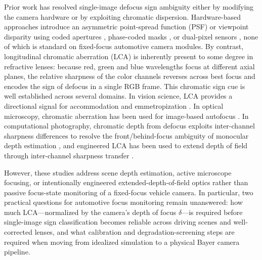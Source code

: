\documentclass{ieee-ojvt}
\begin{document}
Prior work has resolved single-image defocus sign ambiguity either by modifying the camera hardware or by exploiting chromatic dispersion. Hardware-based approaches introduce an asymmetric point-spread function (PSF) or viewpoint disparity using coded apertures \cite{levin2007coded}, phase-coded masks \cite{haim2018phase}, or dual-pixel sensors \cite{garg2019dual}, none of which is standard on fixed-focus automotive camera modules. By contrast, longitudinal chromatic aberration (LCA) is inherently present to some degree in refractive lenses: because red, green and blue wavelengths focus at different axial planes, the relative sharpness of the color channels reverses across best focus and encodes the sign of defocus in a single RGB frame. This chromatic sign cue is well established across several domains. In vision science, LCA provides a directional signal for accommodation and emmetropization \cite{kruger1986stimuli,seidemann2002effects,rucker2012chicks}. In optical microscopy, chromatic aberration has been used for image-based autofocus \cite{fuller2011microscope}. In computational photography, chromatic depth from defocus exploits inter-channel sharpness differences to resolve the front/behind-focus ambiguity of monocular depth estimation \cite{garcia2000chromatic,chakrabarti2012depth,trouve2013passive,zia2021exploring}, and engineered LCA has been used to extend depth of field through inter-channel sharpness transfer \cite{guichard2009edof,cossairt2010spectral}.

However, these studies address scene depth estimation, active microscope focusing, or intentionally engineered extended-depth-of-field optics rather than passive focus-state monitoring of a fixed-focus vehicle camera. In particular, two practical questions for automotive focus monitoring remain unanswered: how much LCA---normalized by the camera's depth of focus $\delta$---is required before single-image sign classification becomes reliable across driving scenes and well-corrected lenses, and what calibration and degradation-screening steps are required when moving from idealized simulation to a physical Bayer camera pipeline.
\end{document}
